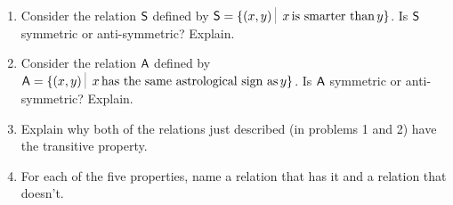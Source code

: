 \begin{enumerate}
\item Consider the relation $\mbox{\textsf S}$ defined by 
$ \relS = \{ (x,y) \suchthat \; x \, \mbox{is smarter than} \, y \}$.
Is $\mbox{\textsf S}$ symmetric or anti-symmetric?  Explain.
\item Consider the relation $\mbox{\textsf A}$ defined by 
$ \relA = \{ (x,y) \suchthat \; x \, \mbox{has the same astrological sign as} \, y \}$.
Is $\mbox{\textsf A}$ symmetric or anti-symmetric?  Explain.
\item Explain why both of the relations just described (in problems 1 and 2)
have the transitive property.
\item For each of the five properties, name a relation that has it
and a relation that doesn't.
\end{enumerate} 

